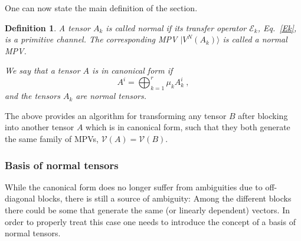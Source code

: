 \documentclass[rmp,aps,reprint,superscriptaddress,nobalancelastpage]{revtex4-1}
\newtheorem{defn}[thm]{Definition}
\begin{document}
    One can now state the main definition of the section.

    \begin{defn}
        \label{def:4:normal-tensor-mps}
        A tensor $A_k$ is called \emph{normal} if its transfer operator $\mathcal E_k$, Eq.~\eqref{Ek}, is a primitive channel. The  corresponding MPV $|V^{N}(A_k)\rangle$ is called a \emph{normal MPV}.

        We say that a tensor $A$ is in \emph{canonical form} if
        \begin{equation}
            \label{eq:II_CF1}
            A^i = \bigoplus_{k=1}^r \mu_k A^i_k\ ,
        \end{equation}
        and the tensors $A_k$ are normal tensors.
    \end{defn}

    The above provides an algorithm for transforming any tensor $B$ after blocking into  another tensor $A$ which is in canonical form, such that they both generate the same family of MPVs, $\mathcal V(A)=\mathcal V(B)$.

    \subsubsection{Basis of normal tensors}

    While the canonical form does no longer suffer from ambiguities due to off-diagonal blocks, there is still a source of ambiguity:
    Among the different blocks there could be some that generate the same (or linearly dependent) vectors. In order to properly treat this case one needs to introduce the concept of a basis of normal tensors.
\end{document}
